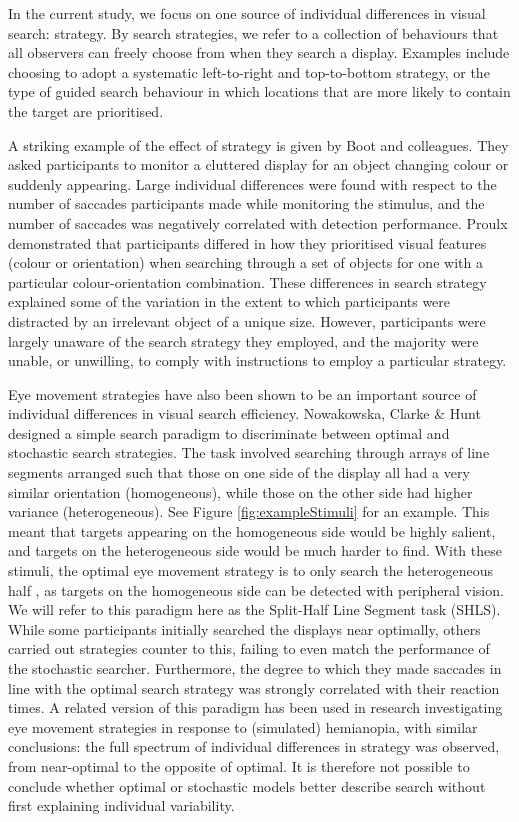 \documentclass[twocolumn]{article}
\begin{document}
In the current study, we focus on one source of individual differences in visual search: strategy. By search strategies, we refer to a collection of behaviours that all observers can freely choose from when they search a display. Examples include choosing to adopt a systematic left-to-right and top-to-bottom strategy\cite{gilchrist2006}, or the type of guided search behaviour in which locations that are more likely to contain the target are prioritised\cite{wolfe2015}. 

A striking example of the effect of strategy is given by Boot and colleagues\cite{boot2006}. They asked participants to monitor a cluttered display for an object changing colour or suddenly appearing. Large individual differences were found with respect to the number of saccades participants made while monitoring the stimulus, and the number of saccades was negatively correlated with detection performance. Proulx\cite{proulx2011} demonstrated that participants differed in how they prioritised visual features (colour or orientation) when searching through a set of objects for one with a particular colour-orientation combination. These differences in search strategy explained some of the variation in the extent to which participants were distracted by an irrelevant object of a unique size. However, participants were largely unaware of the search strategy they employed, and the majority were unable, or unwilling, to comply with instructions to employ a particular strategy.

Eye movement strategies have also been shown to be an important source of individual differences in visual search efficiency. Nowakowska, Clarke \& Hunt\cite{nowakowska2017} designed a simple search paradigm to discriminate between optimal\cite{najemnik-geisler2008} and stochastic \cite{clarke2016} search strategies. The task involved searching through arrays of line segments arranged such that those on one side of the display all had a very similar orientation (homogeneous), while those on the other side had higher variance (heterogeneous). See Figure \ref{fig:exampleStimuli} for an example. This meant that targets appearing on the homogeneous side would be highly salient, and targets on the heterogeneous side  would be much harder to find. With these stimuli, the optimal eye movement strategy is to only search the heterogeneous half , as targets on the homogeneous side can be detected with peripheral vision. We will refer to this paradigm here as the Split-Half Line Segment task (SHLS). While some participants initially searched the displays near optimally, others carried out strategies counter to this, failing to even match the performance of the stochastic searcher. Furthermore, the degree to which they made saccades in line with the optimal search strategy was strongly correlated with their reaction times. A related version of this paradigm has been used in research investigating eye movement strategies in response to (simulated) hemianopia\cite{nowakowska2016,nowakowska2018}, with similar conclusions: the full spectrum of individual differences in strategy was observed, from near-optimal to the opposite of optimal. It is therefore not possible to conclude whether optimal or stochastic models better describe search without first explaining individual variability.
\end{document}
